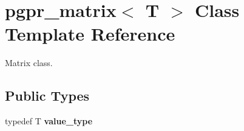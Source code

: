 \hypertarget{classpgpr__matrix}{\section{pgpr\-\_\-matrix$<$ T $>$ Class Template Reference}
\label{classpgpr__matrix}
}


Matrix class.  


\subsection*{Public Types}
\begin{DoxyCompactItemize}
\item 
\hypertarget{classpgpr__matrix_a5fd37a105951efdd380647fc006eaa5e}{typedef T {\bfseries value\-\_\-type}}\label{classpgpr__matrix_a5fd37a105951efdd380647fc006eaa5e}

\end{DoxyCompactItemize}
